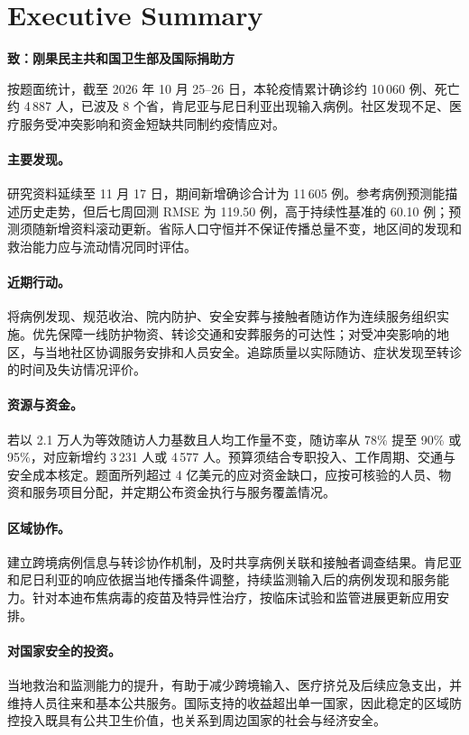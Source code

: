 \section*{Executive Summary}
\label{sec:executive-summary}

\noindent\textbf{致：刚果民主共和国卫生部及国际捐助方}

\medskip
按题面统计，截至 2026 年 10 月 25--26 日，本轮疫情累计确诊约 10\,060 例、死亡约 4\,887 人，已波及 8 个省，肯尼亚与尼日利亚出现输入病例。社区发现不足、医疗服务受冲突影响和资金短缺共同制约疫情应对。

\paragraph{主要发现。}
研究资料延续至 11 月 17 日，期间新增确诊合计为 11\,605 例。参考病例预测能描述历史走势，但后七周回测 RMSE 为 119.50 例，高于持续性基准的 60.10 例；预测须随新增资料滚动更新。省际人口守恒并不保证传播总量不变，地区间的发现和救治能力应与流动情况同时评估。

\paragraph{近期行动。}
将病例发现、规范收治、院内防护、安全安葬与接触者随访作为连续服务组织实施。优先保障一线防护物资、转诊交通和安葬服务的可达性；对受冲突影响的地区，与当地社区协调服务安排和人员安全。追踪质量以实际随访、症状发现至转诊的时间及失访情况评价。

\paragraph{资源与资金。}
若以 2.1 万人为等效随访人力基数且人均工作量不变，随访率从 78\% 提至 90\% 或 95\%，对应新增约 3\,231 人或 4\,577 人。预算须结合专职投入、工作周期、交通与安全成本核定。题面所列超过 4 亿美元的应对资金缺口，应按可核验的人员、物资和服务项目分配，并定期公布资金执行与服务覆盖情况。

\paragraph{区域协作。}
建立跨境病例信息与转诊协作机制，及时共享病例关联和接触者调查结果。肯尼亚和尼日利亚的响应依据当地传播条件调整，持续监测输入后的病例发现和服务能力。针对本迪布焦病毒的疫苗及特异性治疗，按临床试验和监管进展更新应用安排。

\paragraph{对国家安全的投资。}
当地救治和监测能力的提升，有助于减少跨境输入、医疗挤兑及后续应急支出，并维持人员往来和基本公共服务。国际支持的收益超出单一国家，因此稳定的区域防控投入既具有公共卫生价值，也关系到周边国家的社会与经济安全。
